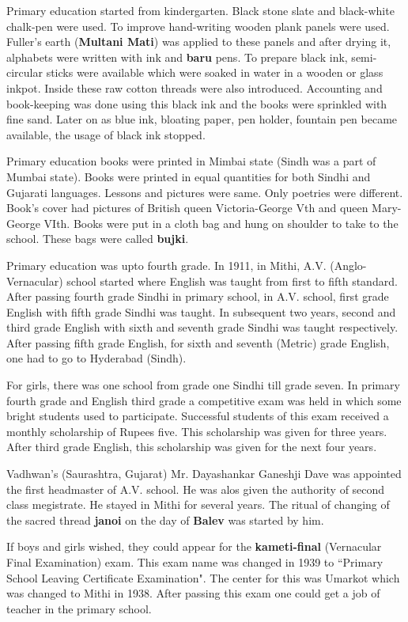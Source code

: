 Primary education started from kindergarten. Black stone slate and black-white
chalk-pen were used. To improve hand-writing wooden plank panels were used.
Fuller's earth (\textbf{Multani Mati}) was applied to these panels and after
drying it, alphabets were written with ink and \textbf{baru} pens. To prepare
black ink, semi-circular sticks were available which were soaked in water in a
wooden or glass inkpot. Inside these raw cotton threads were also introduced.
Accounting and book-keeping was done using this black ink and the books were
sprinkled with fine sand. Later on as blue ink, bloating paper, pen holder,
fountain pen became available, the usage of black ink stopped.

Primary education books were printed in Mimbai state (Sindh was a part of Mumbai
state). Books were printed in equal quantities for both Sindhi and Gujarati
languages. Lessons and pictures were same. Only poetries were different. Book's
cover had pictures of British queen Victoria-George Vth and queen Mary-George
VIth. Books were put in a cloth bag and hung on shoulder to take to the school.
These bags were called \textbf{bujki}.

Primary education was upto fourth grade. In 1911, in Mithi, A.V.
(Anglo-Vernacular) school started where English was taught from first to fifth
standard. After passing fourth grade Sindhi in primary school, in A.V. school,
first grade English with fifth grade Sindhi was taught. In subsequent two years,
second and third grade English with sixth and seventh grade Sindhi was taught
respectively. After passing fifth grade English, for sixth and seventh (Metric)
grade English, one had to go to Hyderabad (Sindh).

For girls, there was one school from grade one Sindhi till grade seven. In
primary fourth grade and English third grade a competitive exam was held in
which some bright students used to participate. Successful students of this exam
received a monthly scholarship of Rupees five. This scholarship was given for
three years. After third grade English, this scholarship was given for the next
four years.

Vadhwan's (Saurashtra, Gujarat) Mr. Dayashankar Ganeshji Dave was appointed the
first headmaster of A.V. school. He was alos given the authority of second class
megistrate. He stayed in Mithi for several years. The ritual of changing of the sacred thread
\textbf{janoi} on the day of \textbf{Balev} was started by him.

If boys and girls wished, they could appear for the \textbf{kameti-final}
(Vernacular Final Examination) exam. This exam name was changed in 1939 to
``Primary School Leaving Certificate Examination". The center for this was
Umarkot which was changed to Mithi in 1938. After passing this exam one could
get a job of teacher in the primary school.

